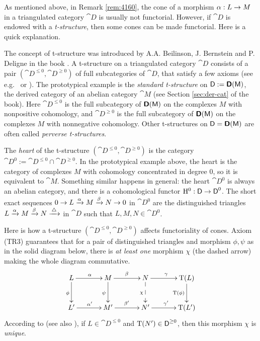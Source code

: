 \begin{rem} \label{rem:3600}
As mentioned above, in Remark \ref{rem:4160}, the cone of a morphism 
$\alpha : L \to M$ in a triangulated category $\cat{D}$ is usually not functorial. 
However, if $\cat{D}$ is endowed with a {\em t-structure},
then some cones can be made functorial. Here is a quick explanation. 

The concept of t-structure was introduced by A.A. Beilinson, J. Bernstein and 
P. Deligne in the book \cite{BBD}. A t-structure on a triangulated category 
$\cat{D}$ consists of a pair $(\cat{D}^{\leq 0}, \cat{D}^{\geq 0})$ of full 
subcategories of $\cat{D}$, that satisfy a few axioms (see e.g.\ 
\cite[Chapter X]{KaSc1} or \cite[Definition 4.1]{YeZh2}). The prototypical 
example is the {\em standard t-structure} on $\operatorname{\mathsf{D}} := \boldsymbol{\mathsf{D}}(\operatorname{\mathsf{M}})$, 
the derived category of an abelian category $\cat{M}$
(see Section \ref{sec:der-cat} of the book). Here $\cat{D}^{\leq 0}$ 
is the full subcategory of $\boldsymbol{\mathsf{D}}(\operatorname{\mathsf{M}})$ on the complexes $M$ with 
nonpositive cohomology, and 
$\cat{D}^{\geq 0}$ is the full subcategory of $\boldsymbol{\mathsf{D}}(\operatorname{\mathsf{M}})$ 
on the complexes $M$ with nonnegative cohomology. Other t-structures on 
$\operatorname{\mathsf{D}} = \boldsymbol{\mathsf{D}}(\operatorname{\mathsf{M}})$ are often called {\em perverse t-structures}. 

The {\em heart} of the t-structure $(\cat{D}^{\leq 0}, \cat{D}^{\geq 0})$ is 
the category 
$\cat{D}^{0} := \cat{D}^{\leq 0} \cap \cat{D}^{\geq 0}$.
In the prototypical example above, the heart is the category of complexes $M$ 
with cohomology concentrated in degree $0$, so it is equivalent to $\cat{M}$. 
Something similar happens in general: the heart $\cat{D}^{0}$ is always an 
abelian category, and there is a cohomological functor 
$\mathrm{H}^0 : \operatorname{\mathsf{D}} \to \operatorname{\mathsf{D}}^{0}$.
The short exact sequences 
$0 \to L \xrightarrow{\alpha} M \xrightarrow{\beta} N \to 0$
in $\cat{D}^{0}$ are the distinguished triangles 
$L \xrightarrow{\alpha} M \xrightarrow{\beta} N \xrightarrow{\, \triangle\, }$
in $\cat{D}$ such that $L, M, N \in \cat{D}^{0}$.

Here is how a t-structure $(\cat{D}^{\leq 0}, \cat{D}^{\geq 0})$ affects 
functoriality of cones. 
Axiom (TR3) guarantees that for a pair of distinguished triangles and 
morphism $\phi, \psi$ as in the solid diagram below, there is {\em at least 
one} morphism $\chi$ (the dashed arrow) making the whole diagram commutative.  
\[ \UseTips  \xymatrix @C=8ex @R=6ex { 
L 
\ar[r]^{\al}
\ar[d]_{\phi}
&
M
\ar[r]^{\be}
\ar[d]_{\psi}
& 
N
\ar[r]^{\ga}
\ar@{-->}[d]_{\chi}
&
\opn{T}(L)
\ar[d]_{\opn{T}(\phi)}
\\
L' 
\ar[r]^{\al'}
&
M'
\ar[r]^{\be'}
& 
N'
\ar[r]^{\ga'}
&
\opn{T}(L') 
} \]
According to \cite[Proposition 1.1.9]{BBD} (see also \cite[Lemma 4.10]{YeZh2}),
if $L \in \cat{D}^{\leq 0}$ and $\operatorname{T}(N') \in \operatorname{\mathsf{D}}^{\geq 0}$, then this 
morphism $\chi$ is {\em unique}. 


\end{rem}
